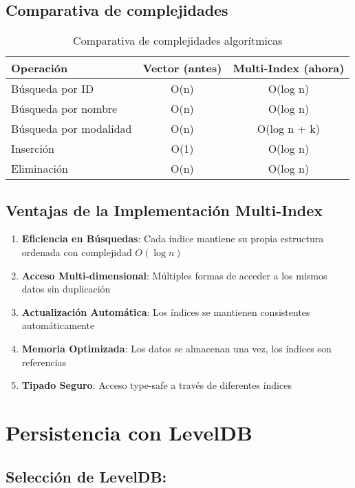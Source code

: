 \documentclass[12pt]{article}
\begin{document}
	\subsection*{Comparativa de complejidades}

	\begin{table}[h]
		\centering
		\begin{tabular}{|l|c|c|}
			\hline
			\textbf{Operación} & \textbf{Vector (antes)} & \textbf{Multi-Index (ahora)} \\
			\hline
			Búsqueda por ID & O(n) & O(log n) \\
			Búsqueda por nombre & O(n) & O(log n) \\
			Búsqueda por modalidad & O(n) & O(log n + k) \\
			Inserción & O(1) & O(log n) \\
			Eliminación & O(n) & O(log n) \\
			\hline
		\end{tabular}
		\caption{Comparativa de complejidades algorítmicas}
	\end{table}
	
	\subsection*{Ventajas de la Implementación Multi-Index}
	
	\begin{enumerate}
		\item \textbf{Eficiencia en Búsquedas}: Cada índice mantiene su propia estructura ordenada con complejidad $O(\log n)$
		\item \textbf{Acceso Multi-dimensional}: Múltiples formas de acceder a los mismos datos sin duplicación
		\item \textbf{Actualización Automática}: Los índices se mantienen consistentes automáticamente
		\item \textbf{Memoria Optimizada}: Los datos se almacenan una vez, los índices son referencias
		\item \textbf{Tipado Seguro}: Acceso type-safe a través de diferentes índices
	\end{enumerate}
	
	
	\section{Persistencia con LevelDB}
	
	\subsection*{Selección de LevelDB:}
	
\end{document}
